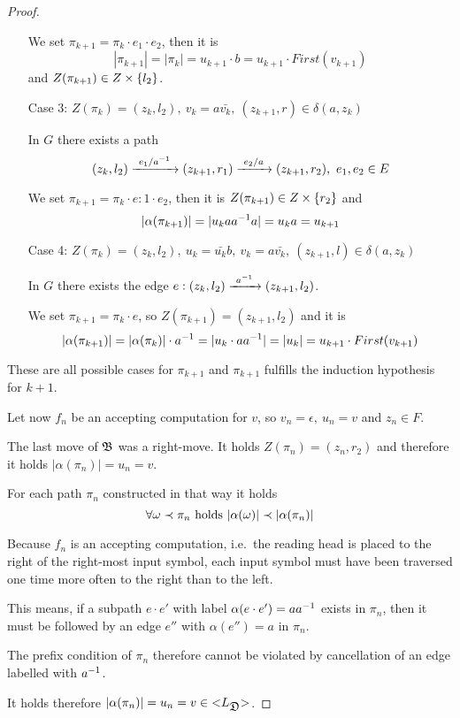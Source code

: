 \begin{proof}
\begin{itemize}
  We set $\pi_{k+1} = \pi_k \cdot e_1 \cdot e_2$, then it is
  \[ |\pi_{k+1}| = |\pi_k| = u_{k+1} \cdot b = u_{k+1} \cdot First(v_{k+1}) \]
  and $Z(\pi_{k+1}) \in Z \times \mbox{$\{l_2\}$}$.
  
  \item[Case 3:] $Z(\pi_k) = (z_k, l_2),\ v_k = a \bar{v_k},\ (z_{k+1}, r) \in
  \delta(a, z_k)$
  
  In $G$ there exists a path 
  \[ (z_k, l_2) \xrightarrow{\ {e_1 / {{a}^{-1}}}\ } (z_{k+1}, r_1) \xrightarrow{\ {e_2 / a}\ } (z_{k+1},
  r_2),\ e_1, e_2 \in E \]
  
  We set $\pi_{k+1} = \pi_k \cdot e:1 \cdot e_2$, then it is $Z(\pi_{k+1}) \in
  Z \times \mbox{$\{r_2\}$}$ and
  \[ |\alpha(\pi_{k+1})| = |u_k a {{a}^{-1}} a| = u_k a = u_{k+1} \]
  
  \item[Case 4:] $Z(\pi_k) = (z_k, l_2),\ u_k = \bar{u_k} b,\ v_k = a
  \bar{v_k},\ (z_{k+1}, l) \in \delta(a, z_k)$
  
  In $G$ there exists the edge $e: (z_k, l_2) \xrightarrow{\ {{{a}^{-1}}}\ } (z_{k+1}, l_2)$.
  
  We set $\pi_{k+1} = \pi_k \cdot e$, so $Z(\pi_{k+1}) = (z_{k+1}, l_2)$ and it
  is
  \[ |\alpha(\pi_{k+1})| = |\alpha(\pi_k)| \cdot {{a}^{-1}} = |u_k \cdot a {{a}^{-1}}|
  = |u_k| = u_{k+1} \cdot First(v_{k+1}) \]
\end{itemize}

These are all possible cases for $\pi_{k+1}$ and $\pi_{k+1}$ fulfills the
induction hypothesis for $k+1$.

Let now $f_n$ be an accepting computation for $v$, so $v_n = \epsilon,\ u_n = v$
and $z_n \in F$.

The last move of $\mbox{$\mathfrak{B}$}$ was a right-move. It holds $Z(\pi_n) = (z_n, r_2)$ and
therefore it holds $|\alpha(\pi_n)| = u_n = v$.

For each path $\pi_n$ constructed in that way it holds
\[ \forall \omega \prec \pi_n \text{ holds }|\alpha(\omega)| \prec
|\alpha(\pi_n)| \]

Because $f_n$ is an accepting computation, i.e.\ the reading head is placed to
the right of the right-most input symbol, each input symbol must have been
traversed one time more often to the right than to the left.

This means, if a subpath $e \cdot e'$ with label $\alpha(e \cdot e') = a
{{a}^{-1}}$ exists in $\pi_n$, then it must be followed by an edge $e''$ with
$\alpha(e'') = a$ in $\pi_n$.

The prefix condition of $\pi_n$ therefore cannot be violated by cancellation of
an edge labelled with ${{a}^{-1}}$.

It holds therefore $|\alpha(\pi_n)| = u_n = v \in \mbox{${<}{L_{\mbox{$\mathfrak{D}$}}}{>}$}$.
\end{proof}

